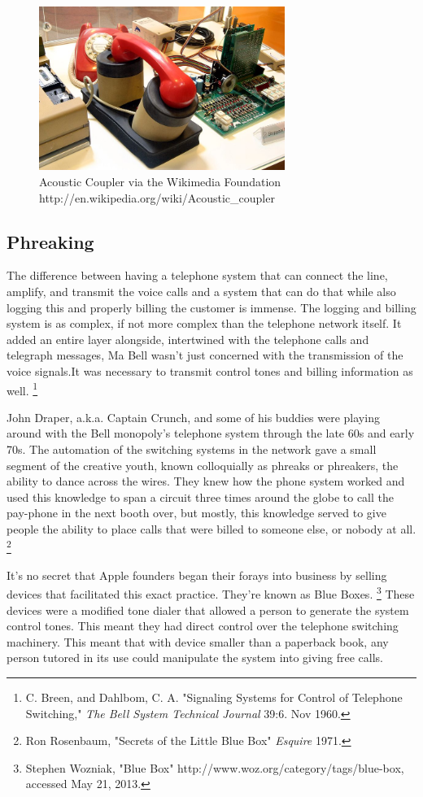 \documentclass[11pt]{article}
\begin{document}
\begin{figure}[ht!]
\center
\includegraphics[width=80mm]{800px-Coupleur-accoustique-IMG_0298.JPG}
\caption{Acoustic Coupler via the Wikimedia Foundation http://en.wikipedia.org/wiki/Acoustic\_coupler}
\end{figure}

\subsection{Phreaking}

The difference between having a telephone system that can connect the line, amplify, and transmit the voice calls and a system that can do that while also logging this and properly billing the customer is immense. The logging and billing system is as complex, if not more complex than the telephone network itself. It added an entire layer alongside, intertwined with the telephone calls and telegraph messages, Ma Bell wasn't just concerned with the transmission of the voice signals.It was necessary to transmit control tones and billing information as well.
\footnote{C. Breen, and Dahlbom, C. A. "Signaling Systems for Control of Telephone Switching," \emph{The Bell System Technical Journal} 39:6. Nov 1960.}

John Draper, a.k.a. Captain Crunch, and some of his buddies were playing around with the Bell monopoly's telephone system through the late 60s and early 70s.  The automation of the switching systems in the network gave a small segment of the creative youth, known colloquially as phreaks or phreakers, the ability to dance across the wires. They knew how the phone system worked and used this knowledge to span a circuit three times around the globe to call the pay-phone in the next booth over, but mostly, this knowledge served to give people the ability to place calls that were billed to someone else, or nobody at all.
\footnote{Ron Rosenbaum, "Secrets of the Little Blue Box" \emph{Esquire} 1971.}

It's no secret that Apple founders began their forays into business by selling devices that facilitated this exact practice. They're known as Blue Boxes.
\footnote{
Stephen Wozniak, "Blue Box" http://www.woz.org/category/tags/blue-box, accessed May 21, 2013.
}
These devices were a modified tone dialer that allowed a person to generate the system control tones. This meant they had direct control over the telephone switching machinery. This meant that with device smaller than a paperback book, any person tutored in its use could manipulate the system into giving free calls.
\end{document}
